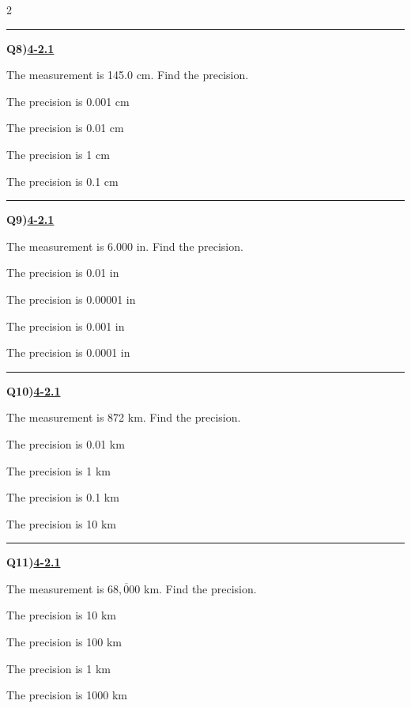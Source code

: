 \documentclass[11pt]{article}
\newenvironment{Qbox}[2]{%
  \par\medskip\noindent\begin{minipage}{\linewidth}%
  \hrule\medskip%
  \textbf{Q#1)}\hfill\textbf{\underline{#2}}\par\smallskip%
}{\par\end{minipage}\par\medskip}
\begin{document}
\begin{multicols}{2}
\begin{Qbox}{8}{4-2.1}
The measurement is 145.0 cm. Find the precision.
\begin{choices}
  \item The precision is 0.001 cm
  \item The precision is 0.01 cm
  \item The precision is 1 cm
  \item The precision is 0.1 cm
\end{choices}
\end{Qbox}

\begin{Qbox}{9}{4-2.1}
The measurement is 6.000 in. Find the precision.
\begin{choices}
  \item The precision is 0.01 in
  \item The precision is 0.00001 in
  \item The precision is 0.001 in
  \item The precision is 0.0001 in
\end{choices}
\end{Qbox}

\begin{Qbox}{10}{4-2.1}
The measurement is 872 km. Find the precision.
\begin{choices}
  \item The precision is 0.01 km
  \item The precision is 1 km
  \item The precision is 0.1 km
  \item The precision is 10 km
\end{choices}
\end{Qbox}

\begin{Qbox}{11}{4-2.1}
The measurement is $68{,}\overline{0}00$ km. Find the precision.
\begin{choices}
  \item The precision is 10 km
  \item The precision is 100 km
  \item The precision is 1 km
  \item The precision is 1000 km
\end{choices}
\end{Qbox}


\end{multicols}
\end{document}
